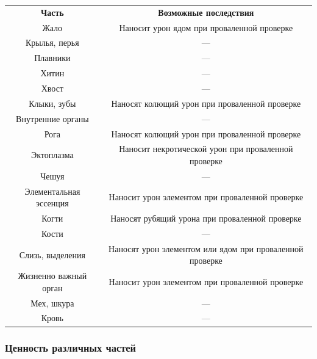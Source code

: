 \documentclass[a4paper, 9pt, twocolumn]{book}
\begin{document}
	\begin{table}[H]
		
		\centering
		
		
		\begin{tabularx}{\linewidth}{>{\hsize}C C}
			\textbf{Часть} & \textbf{Возможные последствия} \\
			Жало & Наносит урон ядом при проваленной проверке \\
			Крылья, перья & --- \\
			Плавники & --- \\
			Хитин & --- \\
			Хвост & --- \\
			Клыки, зубы & Наносят колющий урон при проваленной проверке \\
			Внутренние органы & ---  \\
			Рога & Наносят колющий урон при проваленной проверке \\
			Эктоплазма & Наносит некротической урон при проваленной проверке \\
			Чешуя & --- \\
			Элементальная эссенция & Наносит урон элементом при проваленной проверке \\
			Когти & Наносят рубящий урона при проваленной проверке \\
			Кости & --- \\
			Слизь, выделения & Наносят урон элементом или ядом при проваленной проверке \\
			Жизненно важный орган & Наносит урон элементом при проваленной проверке  \\
			Мех, шкура & --- \\
			Кровь & --- \\
		\end{tabularx}
	\end{table}
	

	
	\subsubsection{Ценность различных частей}
	
\end{document}
